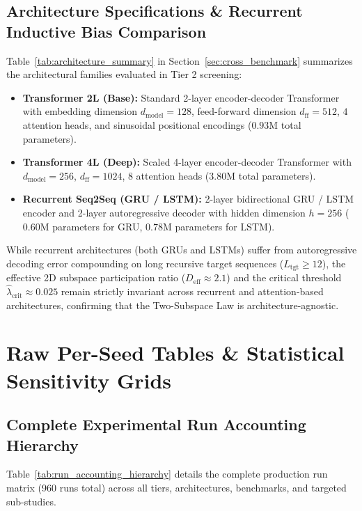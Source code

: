 \documentclass{article}
\theoremstyle{plain}
\theoremstyle{definition}
\begin{document}
\subsection{Architecture Specifications \& Recurrent Inductive Bias Comparison}
\label{sec:appendix_architecture_specs}
Table~\ref{tab:architecture_summary} in Section~\ref{sec:cross_benchmark} summarizes the architectural families evaluated in Tier 2 screening:
\begin{itemize}[leftmargin=*,noitemsep]
    \item \textbf{Transformer 2L (Base):} Standard 2-layer encoder-decoder Transformer \citep{Vaswani2017Attention} with embedding dimension $d_{\text{model}} = 128$, feed-forward dimension $d_{\text{ff}} = 512$, $4$ attention heads, and sinusoidal positional encodings ($0.93\text{M}$ total parameters).
    \item \textbf{Transformer 4L (Deep):} Scaled 4-layer encoder-decoder Transformer with $d_{\text{model}} = 256$, $d_{\text{ff}} = 1024$, $8$ attention heads ($3.80\text{M}$ total parameters).
    \item \textbf{Recurrent Seq2Seq (GRU / LSTM):} 2-layer bidirectional GRU / LSTM encoder and 2-layer autoregressive decoder with hidden dimension $h = 256$ ($0.60\text{M}$ parameters for GRU, $0.78\text{M}$ parameters for LSTM).
\end{itemize}
While recurrent architectures (both GRUs and LSTMs) suffer from autoregressive decoding error compounding on long recursive target sequences ($L_{\text{tgt}} \ge 12$), the effective 2D subspace participation ratio ($D_{\text{eff}} \approx 2.1$) and the critical threshold $\hat{\lambda}_{\text{crit}} \approx 0.025$ remain strictly invariant across recurrent and attention-based architectures, confirming that the Two-Subspace Law is architecture-agnostic.

\section{Raw Per-Seed Tables \& Statistical Sensitivity Grids}
\label{sec:appendix_statistics}

\subsection{Complete Experimental Run Accounting Hierarchy}
\label{sec:app_run_accounting}
Table~\ref{tab:run_accounting_hierarchy} details the complete production run matrix (960 runs total) across all tiers, architectures, benchmarks, and targeted sub-studies.
\end{document}

